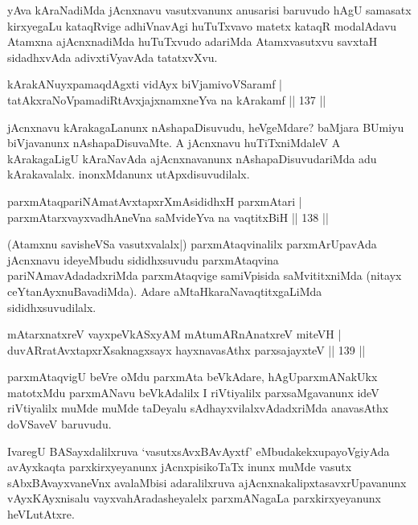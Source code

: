 \begin{artha}
yAva kAraNadiMda jAcnxnavu vasutxvanunx anusarisi baruvudo hAgU samasatx kirxyegaLu kataqRvige adhiVnavAgi huTuTxvavo matetx kataqR modalAdavu Atamxna ajAcnxnadiMda huTuTxvudo adariMda Atamxvasutxvu savxtaH sidadhxvAda adivxtiVyavAda tatatxvXvu.
\end{artha}

\begin{shl}
kArakANuyxpamaqdAgxti vidAyx biVjamivoVSaramf |\\
tatAkxraNoVpamadiRtAvxjajxnamxneYva na kArakamf \hfill || 137 ||
\end{shl}

\begin{artha}
jAcnxnavu kArakagaLanunx nAshapaDisuvudu, heVgeMdare? baMjara BUmiyu biVjavanunx nAshapaDisuvaMte. A jAcnxnavu huTiTxniMdaleV A kArakagaLigU kAraNavAda ajAcnxnavanunx nAshapaDisuvudariMda adu kArakavalalx. inonxMdanunx utApxdisuvudilalx.
\end{artha}

\begin{shl}
parxmAtaqpariNAmatAvxtapxrXmAsididhxH parxmAtari |\\
parxmAtarxvayxvadhAneVna saMvideYva na vaqtitxBiH \hfill || 138 ||
\end{shl}

\begin{artha}%
(Atamxnu savisheVSa vasutxvalalx|) parxmAtaqvinalilx parxmArUpavAda jAcnxnavu ideyeMbudu sididhxsuvudu parxmAtaqvina pariNAmavAdadadx\-\break riMda parxmAtaqvige  samiVpisida saMvititxniMda (nitayx ceYtanAyxnuBavadiMda). Adare aMtaHkaraNavaqtitxgaLiMda sididhxsuvudilalx.
\end{artha}


\begin{shl}
mAtarxnatxreV vayxpeVkASxyAM mAtumARnAnatxreV miteVH |\\
duvARratAvxtapxrXsaknagxsayx hayxnavasAthx parxsajayxteV \hfill || 139 ||
\end{shl}

\begin{artha}
parxmAtaqvigU beVre oMdu parxmAta beVkAdare, hAgU\break parxmANakUkx matotxMdu parxmANavu beVkAdalilx I riVtiyalilx parxsaMgavanunx ideV riVtiyalilx muMde muMde taDeyalu sAdhayxvilalxvAdadxriMda anavasAthx doVSaveV baruvudu.

IvaregU BASayxdalilxruva `vasutxsAvxBAvAyxtf' eMbudakekx\break upayoVgiyAda avAyxkaqta parxkirxyeyanunx jAcnxpisikoTaTx inunx muMde vasutx sAbxBAvayxvaneVnx avalaMbisi adaralilxruva ajAcnxnakalipxtasavxrUpavanunx vAyxKAyxnisalu vayxvahAradasheyalelx parxmANagaLa parxkirxyeyanunx heVLutAtxre.
\end{artha}

